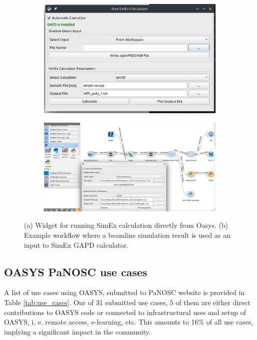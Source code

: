 \documentclass[11pt, a4paper]{article}
\begin{document}
\begin{figure}[htb]
    \centering
    \begin{subfigure}{0.35\textwidth}
        \includegraphics{figures/simexOasysWidget2.png}
        \caption{}
        \label{fig:widget1}
    \end{subfigure}
    \hfil
    \begin{subfigure}{0.55\textwidth}
        \includegraphics{figures/simexOasysWidget.png}
        \caption{}
        \label{fig:workflow}
    \end{subfigure}%
    \caption{(a) Widget for running SimEx calculation directly from Oasys. (b) Example workflow where a beamline simulation result is used as an input to SimEx GAPD calculator.}
\end{figure}

\subsection{OASYS PaNOSC use cases}
\label{subsec:panosc_use_cases}
A list of use cases using OASYS, submitted to PaNOSC website is provided in Table \ref{tab:use_cases}. Our of 31 submitted use cases, 5 of them are either direct contributions to OASYS code or connected to infrastructural uses and setup of OASYS, i. e. remote access, e-learning, etc. This amounts to 16\% of all use cases, implying a significant impact in the community.
\end{document}
